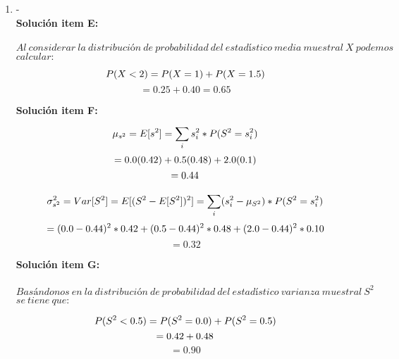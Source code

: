 \begin{enumerate}

    \item-
    \\
    \textbf{Solución item E:}
    \\\\$Al~considerar~la~distribución~de~probabilidad~del~estadístico~media~muestral~X~ podemos$ \\ $calcular:~$

    $$
    P(X<2)=P(X=1)+P(X=1.5)\\$$$$
    =0.25+0.40=0.65
    $$
    
    \textbf{Solución item F:}
    \\
    $$
    \mu_ {s^2} =E[s^2]=\sum_{i}^{}s_i^2*P(S^2=s_i^2)\\$$$$
    =0.0(0.42)+0.5(0.48)+2.0(0.1)\\$$$$
    =0.44\\\\$$$$
    $$
    $$
    \sigma_ {s^2}^2 =Var[S^2]=E[(S^2-E[S^2])^2]=\sum_{i}^{}(s_i^2-\mu_{S^2})*P(S^2=s_i^2)\\$$$$
    =(0.0-0.44)^2*0.42+ (0.5-0.44)^2*0.48 + (2.0-0.44)^2*0.10\\$$$$
    =0.32
    $$
    
     \textbf{Solución item G:}
    \\\\$Basándonos~en~la~distribución~de~probabilidad~del~estadístico~varianza~muestral~S^2$ \\ $se~tiene~que:$

    $$
    P(S^2<0.5)=P(S^2=0.0)+P(S^2=0.5)\\$$$$
    =0.42+0.48\\$$$$
    =0.90
    $$

\end{enumerate}